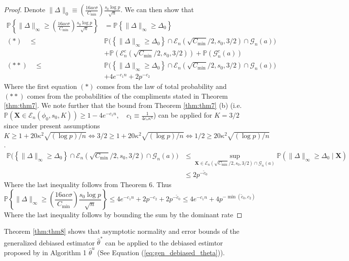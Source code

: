 \documentclass{article}
\begin{document}
\begin{proof}
    Denote $\|\Delta\|_0 \equiv \left(\frac{16ac \sigma}{C_{\min}} \right)\frac{s_0 \log p}{\sqrt{n}}$. We can then show that 
    $$
\begin{aligned}
    \mathbb{P} \left\{ \|\Delta\|_\infty \ge \left( \frac{16ac \sigma}{C_{\min}} \right) \frac{s_0 \log p}{\sqrt{n}} \right\} &= \mathbb{P} \left\{ \|\Delta\|_\infty \ge \Delta_0 \right\} \\
    (*) \quad \le &\mathbb{P} \Big( \left\{ \|\Delta\|_\infty \ge \Delta_0 \right\} \cap \mathcal{E}_n(\sqrt{C_{\min}}/2, s_0, 3/2) \cap \mathcal{G}_n(a) \Big) \\
    &+ \mathbb{P} \left( \mathcal{E}_n^c(\sqrt{C_{\min}}/2, s_0, 3/2) \right) + \mathbb{P}(\mathcal{G}_n^c(a)) \\
    (**) \quad \le &\mathbb{P} \Big( \left\{ \|\Delta\|_\infty \ge \Delta_0 \right\} \cap \mathcal{E}_n(\sqrt{C_{\min}}/2, s_0, 3/2) \cap \mathcal{G}_n(a) \Big)\\ &+4e^{-c_1n} + 2p^{-c_2}
\end{aligned}
    $$
    Where the first equation $(*)$ comes from the law of total probability and $(**)$ comes from the probabilities of the compliments stated in Theorem \ref{thm:thm7}. We note further that the bound from Theorem \ref{thm:thm7} (b) (i.e. $\mathbb{P}(\mathbf{X} \in \mathcal{E}_n(\phi_0, s_0, K)) \ge 1 - 4e^{-c_1n}, \quad c_1 \equiv \frac{1}{4c_* \kappa^4}$) can be applied for $K= 3/2$ since under present assumptions $K \ge 1 + 20\kappa^2 \sqrt{(\log p)/n} \iff 3/2 \ge 1 + 20\kappa^2 \sqrt{(\log p)/n} \iff  1/2 \ge 20\kappa^2 \sqrt{(\log p)/n}$. 
$$
\begin{aligned}
    \mathbb{P} \Big( \left\{ \|\Delta\|_\infty \ge \Delta_0 \right\} \cap \mathcal{E}_n(\sqrt{C_{\min}}/2, s_0, 3/2) \cap \mathcal{G}_n(a) \Big)     &\le \sup_{\mathbf{X} \in \mathcal{E}_n(\sqrt{C_{\min}}/2, s_0, 3/2) \cap \mathcal{G}_n(a)} \mathbb{P} \left( \|\Delta\|_\infty \ge \Delta_0 \mid \mathbf{X} \right) \\
    &\le 2p^{-\tilde{c}_0}
\end{aligned}
 $$
    Where the last inequality follows from Theorem 6. Thus 
    $$
    \mathbb{P}\left\{\|\Delta\|_\infty \ge \left(\frac{16ac \sigma}{C_{\min}} \right)\frac{s_0 \log p}{\sqrt{n}}\right\} \le 4e^{-c_1n} +2p^{-c_2}+ 2p^{-\tilde{c}_0} \le 4e^{-c_1n} + 4p^{-\min(\tilde{c}_0, c_2)}
    $$
    Where the last inequality follows by bounding the sum by the dominant rate
\end{proof}
\noindent
Theorem \ref{thm:thm8} shows that asymptotic normality and error bounds of the generalized debiased estimator $\hat{\theta}^*$ can be applied to the debiased estimtor proposed by \citet{javanmard14a} in Algorithm 1 $\hat{\theta}^u$ (See Equation (\ref{eq:gen_debiased_theta})). 
\end{document}

